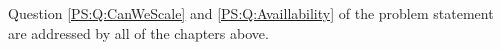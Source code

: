 Question \ref{PS:Q:CanWeScale} and \ref{PS:Q:Availlability} of the problem statement are addressed by all of the chapters above.

%
%
%
%
%
%




